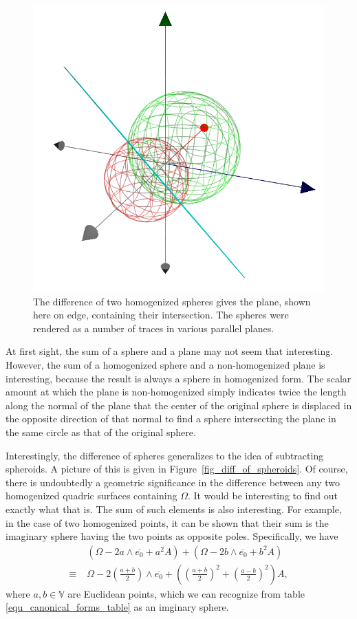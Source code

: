 \documentclass{birkjour}
\theoremstyle{definition}
\theoremstyle{remark}
\numberwithin{equation}{section}
\newcommand{\V}{\mathbb{V}}
\newcommand{\Alpha}{A}
\begin{document}
\begin{figure}
\includegraphics[scale=0.5]{DiffOfSpheres}
\caption{The difference of two homogenized spheres gives the plane, shown here on edge,
containing their intersection.  The spheres were rendered as a number of traces in
various parallel planes.}
\label{fig_diff_of_spheres}
\end{figure}

At first sight, the sum of a sphere and a plane may not seem that interesting.
However, the sum of a homogenized sphere and a non-homogenized plane is
interesting, because the result is always a sphere in homogenized form.  The
scalar amount at which the plane is non-homogenized simply indicates twice
the length along the normal of the plane that the center of the original sphere
is displaced in the opposite direction of that normal to find a sphere intersecting the
plane in the same circle as that of the original sphere.

Interestingly, the difference of spheres generalizes to the idea of subtracting
spheroids.  A picture of this is given in Figure~\ref{fig_diff_of_spheroids}.
Of course, there is undoubtedly a geometric significance in the difference
between any two homogenized quadric surfaces containing $\Omega$.  It
would be interesting to find out exactly what that is.  The sum of such
elements is also interesting.  For example, in the case of two homogenized
points, it can be shown that their sum is the imaginary sphere having the
two points as opposite poles.  Specifically, we have
\begin{align}
 & \left(\Omega-2a\wedge\overline{e_0}+a^2\Alpha\right) +
\left(\Omega-2b\wedge\overline{e_0}+b^2\Alpha\right) \\
\equiv\;& \Omega-2\left(\frac{a+b}{2}\right)\wedge\overline{e_0} +
\left(\left(\frac{a+b}{2}\right)^2+\left(\frac{a-b}{2}\right)^2\right)\Alpha,
\end{align}
where $a,b\in\V$ are Euclidean points, which we can recognize
from table \eqref{equ_canonical_forms_table} as an imginary sphere.
\end{document}
